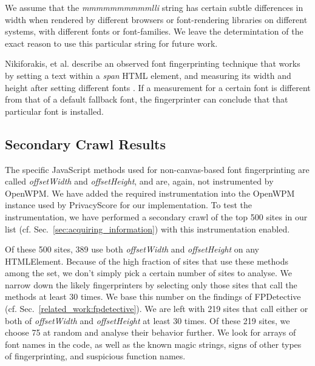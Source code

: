 \documentclass[
    fontsize=12pt,
    headings=small,
    parskip=half,
    bibliography=totoc,
    numbers=noenddot,
    open=any
    ]{scrreprt}
\begin{document}
We assume that the \textit{mmmmmmmmmmlli} string has certain subtle differences in width
when rendered by different browsers or font-rendering libraries on different systems, with
different fonts or font-families. We leave the determintation of the exact reason to use
this particular string for future work.

Nikiforakis, et al. describe an observed font fingerprinting technique that works by setting
a text within a \textit{span} HTML element, and measuring its width and height after setting
different fonts \cite{nikiforakis2013cookieless}. If a measurement for a certain font is different
from that of a default fallback font, the fingerprinter can conclude that that particular font
is installed.

\subsection{Secondary Crawl Results}
The specific JavaScript methods used for non-canvas-based font fingerprinting are called
\textit{offsetWidth} and \textit{offsetHeight}, and are, again, not instrumented by OpenWPM.
We have added the required instrumentation into the OpenWPM instance used by PrivacyScore for our implementation.
To test the instrumentation, we have performed a secondary crawl of the top 500 sites in
our list (cf. Sec.~\ref{sec:acquiring_information}) with this instrumentation enabled.

Of these 500 sites, 389 use both \textit{offsetWidth} and \textit{offsetHeight} on any HTMLElement.
Because of the high fraction of sites that use these methods among the set,
we don't simply pick a certain number of sites to analyse. We narrow down the likely fingerprinters
by selecting only those sites that call the methods at least 30 times.
We base this number on the findings of FPDetective (cf. Sec.~\ref{related_work:fpdetective}).
We are left with 219 sites that call either or both of \textit{offsetWidth} and \textit{offsetHeight}
at least 30 times.
Of these 219 sites, we choose 75 at random and analyse their behavior further.
We look for arrays of font names in the code, as well as the known magic strings, signs of other types
of fingerprinting, and suspicious function names.
\end{document}
